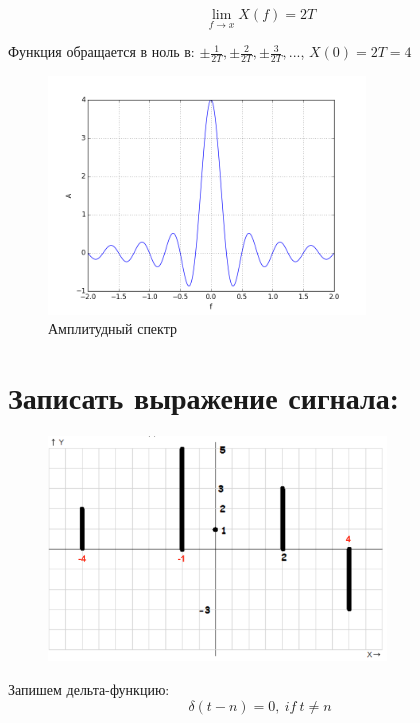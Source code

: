 \documentclass{article}
\begin{document}
\begin{equation*}
    \lim_{f\to{x}}X(f) = 2T
\end{equation*}

Функция обращается в ноль в: 
$\pm\frac{1}{2T}, \pm\frac{2}{2T}, \pm\frac{3}{2T},...$,
$X(0) = 2T = 4$

\begin{figure}[h]
    \centering
    \includegraphics[width=0.75\textwidth]{plot4.png}
    \caption{Амплитудный спектр}
\end{figure}

\newpage
\section{Записать выражение сигнала:}
\begin{figure}[h]
    \centering
    \includegraphics[width=0.8\textwidth]{task5.png}
\end{figure}

Запишем дельта-функцию:
\begin{equation*}
    \delta(t-n) = 0,\:if\:t\ne n
\end{equation*}
\end{document}
